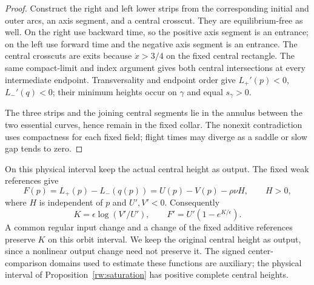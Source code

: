 \begin{proof}
Construct the right and left lower strips from the corresponding
initial and outer arcs, an axis segment, and a central crosscut.
They are equilibrium-free as well. On the right use backward
time, so the positive axis segment is an entrance; on the left
use forward time and the negative axis segment is an entrance.
The central crosscuts are exits because $\dot x>3/4$ on the
fixed central rectangle. The same compact-limit and index argument
gives both central intersections at every intermediate endpoint.
Transversality and endpoint order give $L_+'(p)<0$, $L_-'(q)<0$;
their minimum heights occur on $\gamma$ and equal $s_\gamma>0$.

The three strips and the joining central segments lie in the annulus
between the two essential curves, hence remain in the fixed collar.
The nonexit contradiction uses compactness for each fixed field;
flight times may diverge as a saddle or slow gap tends to zero.
\end{proof}

On this physical interval keep the actual central height as output.
The fixed weak references give
\[
 F(p)=L_+(p)-L_-(q(p))=U(p)-V(p)-\rho\nu H,\qquad H>0,
\]
where $H$ is independent of $p$ and $U',V'<0$. Consequently
\begin{equation}\label{rw:fibre:physical-log}
 K=\epsilon\log(V'/U'),\qquad
 F'=U'(1-e^{K/\epsilon}).
\end{equation}
A common regular input change and a change of the fixed additive
references preserve $K$ on this orbit interval. We keep the original
central height as output, since a nonlinear output change need not
preserve it. The signed center-comparison domains used to estimate
these functions are auxiliary; the physical interval of
Proposition~\ref{rw:saturation} has positive complete central heights.

